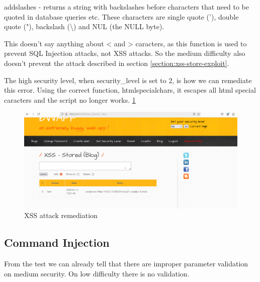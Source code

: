 \documentclass{article}
\begin{document}
addslashes - returns a string with backslashes before characters that need to be quoted in database queries etc.
These characters are single quote ('), double quote ("), backslash (\textbackslash) and NUL (the NULL byte).


This doesn't say anything about < and > caracters, as this function is used to prevent SQL Injection attacks, not XSS attacks.
So the medium difficulty also doesn't prevent the attack described in section \ref{section:xss-store-exploit}.

The high security level, when security\_level is set to 2, is how we can remediate this error.
Using the correct function, htmlspecialchars, it escapes all html special caracters and the script no longer works. \ref{fig:no-longer-works}

\begin{figure}
    \centering
    \includegraphics[width=1\linewidth]{Figures/beef/no-longer-works.png}
    \caption{\label{fig:no-longer-works}XSS attack remediation}
\end{figure}

\subsection{Command Injection}
From the test we can already tell that there are improper parameter validation on medium security. On low difficulty there is no validation.
\end{document}
